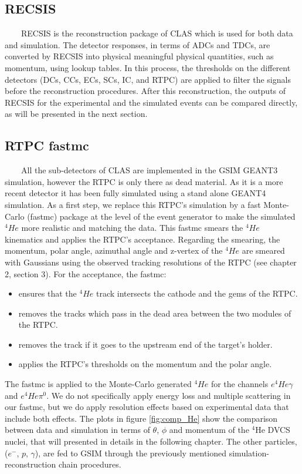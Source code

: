 \subsection{RECSIS}

~~~~RECSIS is the reconstruction package of CLAS which is used for both data 
and simulation. The detector responses, in terms of ADCs and TDCs, are 
converted by RECSIS into physical meaningful physical quantities, such as 
momentum, using lookup tables. In this process, the thresholds on the different 
detectors (DCs, CCs, ECs, SCs, IC, and RTPC) are applied to filter the signals 
before the reconstruction procedures. After this reconstruction, the outputs of 
RECSIS for the experimental and the simulated events can be compared directly, 
as will be presented in the next section.

\subsection{RTPC fastmc}
~~~~All the sub-detectors of CLAS are implemented in the GSIM GEANT3 simulation, 
however the RTPC is only there as dead material. As it is a more recent detector
it has been fully simulated using a stand alone GEANT4 simulation. As a 
first step, we replace this RTPC's simulation by a fast Monte-Carlo (fastmc) 
package at the level of the event generator to make the simulated $^{4}He$ more 
realistic and matching the data. This fastmc smears the $^{4}He$ kinematics and 
applies the RTPC's acceptance. Regarding the smearing, the momentum, polar 
angle, azimuthal angle and z-vertex of the $^{4}He$ are smeared with Gaussians 
using the observed tracking resolutions of the RTPC (see chapter 2, section 3).  
For the acceptance, the fastmc:
\begin{itemize}
\item ensures that the $^{4}He$ track intersects the cathode and the gems of the RTPC.
\item removes the tracks which pass in the dead area between the two modules of the RTPC.
\item removes the track if it goes to the upstream end of the target's holder.
\item applies the RTPC's thresholds on the momentum and the polar angle.
\end{itemize} 

The fastmc is applied to the Monte-Carlo generated $^{4}He$ for the channels 
$e^{4}He\gamma$ and $e^{4}He\pi^{0}$. We do not specifically apply energy loss 
and multiple scattering in our fastmc, but we do apply resolution effects based 
on experimental data that include both effects. The plots in figure 
\ref{fig:comp_He} show the comparison between data and simulation in terms of 
$\theta$, $\phi$ and momentum of the $^{4}$He DVCS nuclei, that will presented 
in details in the following chapter. The other particles, ($e^{-}$, $p$, 
$\gamma$), are fed to GSIM through the previously mentioned 
simulation-reconstruction chain procedures.

